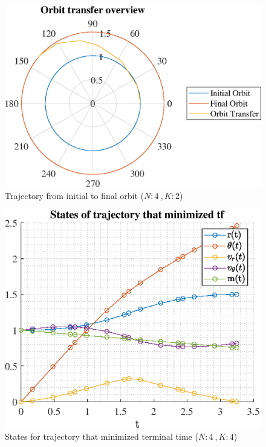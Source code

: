 \documentclass[]{article}
\begin{document}
	\begin{figure}
		\centering
		\includegraphics[scale=0.75]{orbit_N4_K2_C2_tf.eps}
		\caption{Trajectory from initial to final orbit (\(N:4\ , K:2\))}
		\label{fig:orbit_N4_K2_C2_tf}
	\end{figure}
	\begin{figure}
		\centering
		\includegraphics[scale=0.75]{states_N4_K4_C2_tf.eps}
		\caption{States for trajectory that minimized terminal time (\(N:4\ , K:4\))}
		\label{fig:states_N4_K4_C2_tf}
	\end{figure}
\end{document}
